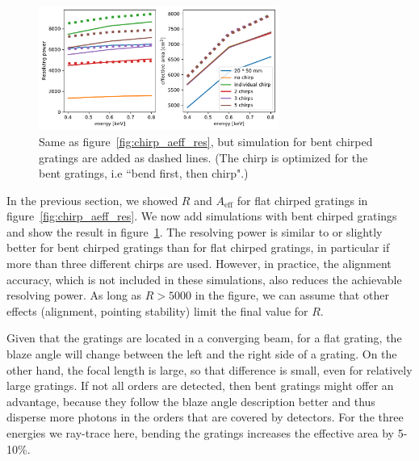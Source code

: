 \documentclass[]{spie}  %
\begin{document}
\label{sect:bend}
\begin{figure} [ht]
\begin{center}
\includegraphics[width=0.7\textwidth]{chirp_aeff_res_bend}
\end{center}
\caption {\label{fig:chirp_aeff_res_bend}
Same as figure~\ref{fig:chirp_aeff_res}, but simulation for bent chirped gratings are added as dashed lines.
(The chirp is optimized for the bent gratings, i.e ``bend first, then chirp".)}
\end{figure}
In the previous section, we showed $R$ and $A_{\mathrm{eff}}$ for flat chirped gratings in figure~\ref{fig:chirp_aeff_res}. We now add simulations with bent chirped gratings and show the result in figure~\ref{fig:chirp_aeff_res_bend}. The resolving power is similar to or slightly better for bent chirped gratings than for flat chirped gratings, in particular if more than three different chirps are used. However, in practice, the alignment accuracy, which is not included in these simulations, also reduces the achievable resolving power. As long as $R > 5000$ in the figure, we can assume that other effects (alignment, pointing stability) limit the final value for $R$. 

Given that the gratings are located in a converging beam, for a flat grating, the blaze angle will change between the left and the right side of a grating. On the other hand, the focal length is large, so that difference is small, even for relatively large gratings. If not all orders are detected, then bent gratings might offer an advantage, because they follow the blaze angle description better and thus disperse more photons in the orders that are covered by detectors. For the three energies we ray-trace here, bending the gratings increases the effective area by 5-10\%.
\end{document}
